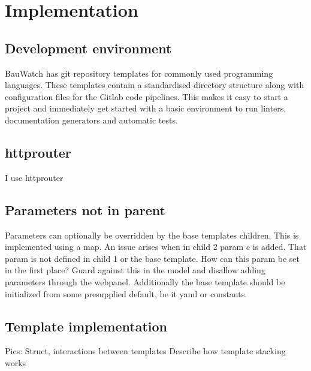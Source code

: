 \chapter{Implementation}
\section{Development environment}
BauWatch has git repository templates for commonly used programming languages. These templates contain a standardised directory structure along with configuration
files for the Gitlab code pipelines. This makes it easy to start a project and immediately get started with a basic environment to run linters, documentation
generators and automatic tests.

\section{httprouter}
I use httprouter

\section{Parameters not in parent}
Parameters can optionally be overridden by the base templates children. This is implemented using a map.
An issue arises when in child 2 param c is added. That param is not defined in child 1 or the base template.
How can this param be set in the first place?
Guard against this in the model and disallow adding parameters through the webpanel.
Additionally the base template should be initialized from some presupplied default, be it yaml or constants.

\section{Template implementation}
Pics:
Struct, interactions between templates
Describe how template stacking works
